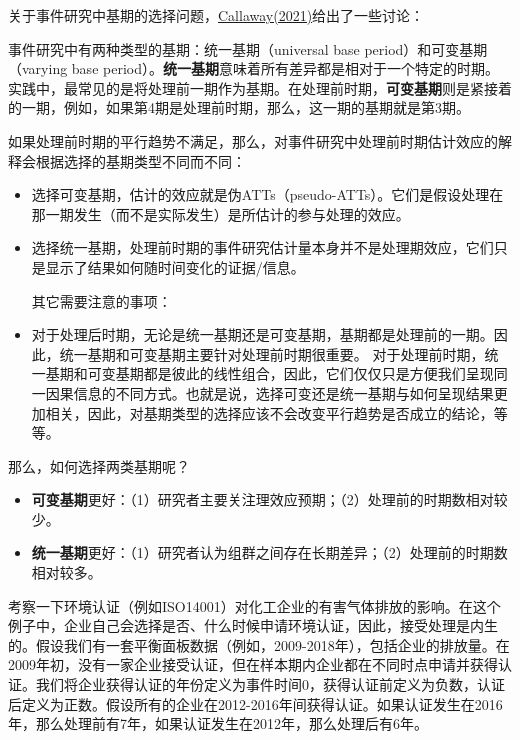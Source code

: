 \documentclass[cn,12pt,math=newtx,citestyle=gb7714-2015,bibstyle=gb7714-2015]{elegantbook}
\begin{document}
	关于事件研究中基期的选择问题，\href{https://bcallaway11.github.io/posts/event-study-universal-v-varying-base-period}{Callaway(2021)}给出了一些讨论：
	
	事件研究中有两种类型的基期：统一基期（universal base period）和可变基期（varying base period）。\textbf{统一基期}意味着所有差异都是相对于一个特定的时期。实践中，最常见的是将处理前一期作为基期。在处理前时期，\textbf{可变基期}则是紧接着的一期，例如，如果第4期是处理前时期，那么，这一期的基期就是第3期。
	
	如果处理前时期的平行趋势不满足，那么，对事件研究中处理前时期估计效应的解释会根据选择的基期类型不同而不同：
	
	\begin{itemize}
		\item 选择可变基期，估计的效应就是伪ATTs（pseudo-ATTs）。它们是假设处理在那一期发生（而不是实际发生）是所估计的参与处理的效应。
		\item 选择统一基期，处理前时期的事件研究估计量本身并不是处理期效应，它们只是显示了结果如何随时间变化的证据/信息。
		
		其它需要注意的事项：
		
		\item 对于处理后时期，无论是统一基期还是可变基期，基期都是处理前的一期。因此，统一基期和可变基期主要针对处理前时期很重要。
		\ietm 对于处理前时期，统一基期和可变基期都是彼此的线性组合，因此，它们仅仅只是方便我们呈现同一因果信息的不同方式。也就是说，选择可变还是统一基期与如何呈现结果更加相关，因此，对基期类型的选择应该不会改变平行趋势是否成立的结论，等等。		
	\end{itemize}	

    那么，如何选择两类基期呢？
    
    \begin{itemize}
         \item  \textbf{可变基期}更好：（1）研究者主要关注理效应预期；（2）处理前的时期数相对较少。
         \item  \textbf{统一基期}更好：（1）研究者认为组群之间存在长期差异；（2）处理前的时期数相对较多。
		\end{itemize}
	
	    考察一下环境认证（例如ISO14001）对化工企业的有害气体排放的影响。在这个例子中，企业自己会选择是否、什么时候申请环境认证，因此，接受处理是内生的。假设我们有一套平衡面板数据（例如，2009-2018年），包括企业的排放量。在2009年初，没有一家企业接受认证，但在样本期内企业都在不同时点申请并获得认证。我们将企业获得认证的年份定义为事件时间0，获得认证前定义为负数，认证后定义为正数。假设所有的企业在2012-2016年间获得认证。如果认证发生在2016年，那么处理前有7年，如果认证发生在2012年，那么处理后有6年。
	    
\end{document}
